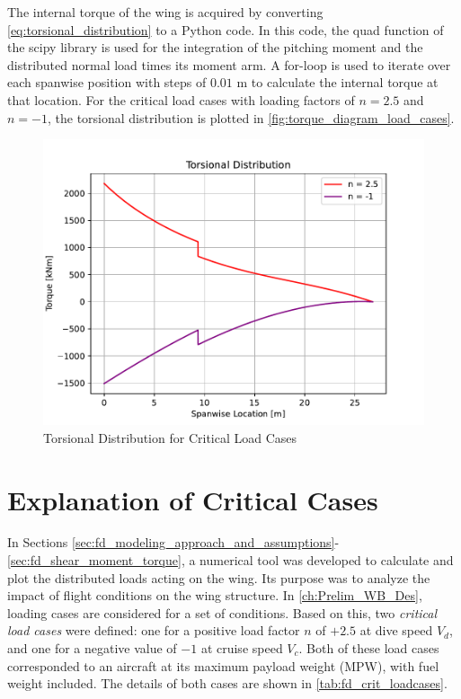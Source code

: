 \noindent The internal torque of the wing is acquired by converting \autoref{eq:torsional_distribution} to a Python code. In this code, the quad function of the scipy library is used for the integration of the pitching moment and the distributed normal load times its moment arm. A for-loop is used to iterate over each spanwise position with steps of $0.01$ m to calculate the internal torque at that location. For the critical load cases with loading factors of $n = 2.5$ and $n = -1$, the torsional distribution is plotted in \autoref{fig:torque_diagram_load_cases}.

\begin{figure}[H]
    \centering
    \includegraphics[width=0.8\linewidth]{figures/Torsional distribution of critical load cases.pdf}
    \caption{Torsional Distribution for Critical Load Cases}
    \label{fig:torque_diagram_load_cases}
\end{figure}

\section{Explanation of Critical Cases} \label{sec:fd_critical_cases}
In Sections \ref{sec:fd_modeling_approach_and_assumptions}-\ref{sec:fd_shear_moment_torque}, a numerical tool was developed to calculate and plot the distributed loads acting on the wing. Its purpose was to analyze the impact of flight conditions on the wing structure. In \autoref{ch:Prelim_WB_Des}, loading cases are considered for a set of conditions. Based on this, two \textit{critical load cases} were defined: one for a positive load factor $n$ of $+2.5$ at dive speed $V_d$, and one for a negative value of $-1$ at cruise speed $V_c$. Both of these load cases corresponded to an aircraft at its maximum payload weight (MPW), with fuel weight included. The details of both cases are shown in \autoref{tab:fd_crit_loadcases}.


